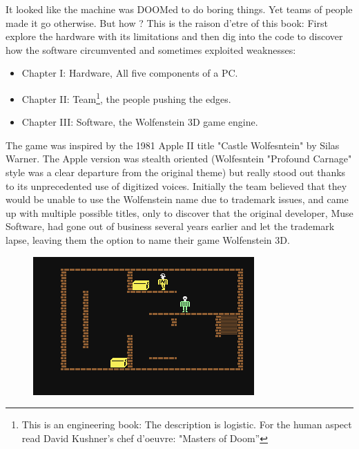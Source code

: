 It looked like the machine was DOOMed to do boring things. Yet teams of people made it go otherwise. But how ? This is the raison d'etre of this book: First explore the hardware with its limitations and then dig into the code to discover how the software circumvented and sometimes exploited weaknesses:
\begin{itemize}
\item Chapter I: Hardware, All five components of a PC.
\item Chapter II: Team\footnote{This is an engineering book: The description is logistic. For the human aspect read David Kushner's chef d'oeuvre: "Masters of Doom''}, the people pushing the edges.
\item Chapter III: Software, the Wolfenstein 3D game engine.
\end{itemize}
\par
{} The game was inspired by the 1981 Apple II title "Castle Wolfesntein" by Silas Warner. The Apple version was stealth oriented (Wolfesntein "Profound Carnage" style was a clear departure from the original theme) but really stood out thanks to its unprecedented use of digitized voices. Initially the team believed that they would be unable to use the Wolfenstein name due to trademark issues, and came up with multiple possible titles, only to discover that the original developer, Muse Software, had gone out of business several years earlier and let the trademark lapse, leaving them the option to name their game Wolfenstein 3D.

 \begin{figure}[H]
\centering
      \includegraphics[width=\textwidth]{screenshots/CastleWolfensteinC64.png}
\end{figure}
